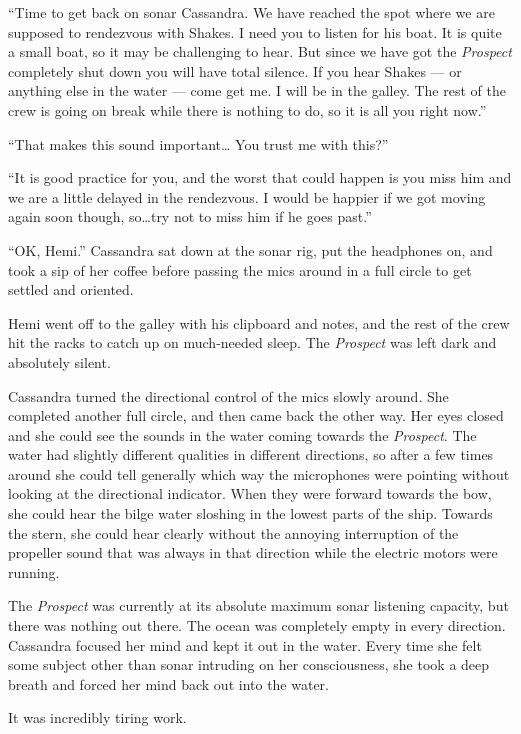 \documentclass[
]{scrbook}
\begin{document}
``Time to get back on sonar Cassandra. We have reached the spot where we
are supposed to rendezvous with Shakes. I need you to listen for his
boat. It is quite a small boat, so it may be challenging to hear. But
since we have got the \emph{Prospect} completely shut down you will have
total silence. If you hear Shakes --- or anything else in the water ---
come get me. I will be in the galley. The rest of the crew is going on
break while there is nothing to do, so it is all you right now.''

``That makes this sound important\ldots{} You trust me with this?''

``It is good practice for you, and the worst that could happen is you
miss him and we are a little delayed in the rendezvous. I would be
happier if we got moving again soon though, so\ldots try not to miss him
if he goes past.''

``OK, Hemi.'' Cassandra sat down at the sonar rig, put the headphones
on, and took a sip of her coffee before passing the mics around in a
full circle to get settled and oriented.

Hemi went off to the galley with his clipboard and notes, and the rest
of the crew hit the racks to catch up on much-needed sleep. The
\emph{Prospect} was left dark and absolutely silent.

Cassandra turned the directional control of the mics slowly around. She
completed another full circle, and then came back the other way. Her
eyes closed and she could see the sounds in the water coming towards the
\emph{Prospect}. The water had slightly different qualities in different
directions, so after a few times around she could tell generally which
way the microphones were pointing without looking at the directional
indicator. When they were forward towards the bow, she could hear the
bilge water sloshing in the lowest parts of the ship. Towards the stern,
she could hear clearly without the annoying interruption of the
propeller sound that was always in that direction while the electric
motors were running.

The \emph{Prospect} was currently at its absolute maximum sonar
listening capacity, but there was nothing out there. The ocean was
completely empty in every direction. Cassandra focused her mind and kept
it out in the water. Every time she felt some subject other than sonar
intruding on her consciousness, she took a deep breath and forced her
mind back out into the water.

It was incredibly tiring work.
\end{document}
